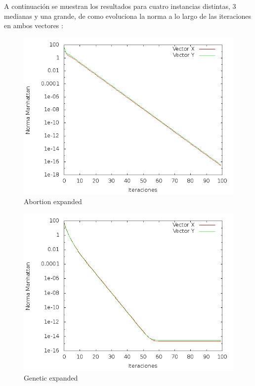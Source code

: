 A continuación se muestran los resultados para cuatro instancias distintas, 3 medianas y una grande, de como evoluciona la norma a lo largo de las iteraciones en ambos vectores :
\begin{figure}[!htb]
\begin{center}
       \includegraphics[scale=0.5]{imagenes/hits-abortion-expanded.png}
       \caption{Abortion expanded }
  \end{center}
\end{figure}
\begin{figure}[!htb]
\begin{center}
        \includegraphics[scale=0.5]{imagenes/hits-genetic-expanded.png}
       \caption{Genetic expanded }
       \end{center}
\end{figure}

